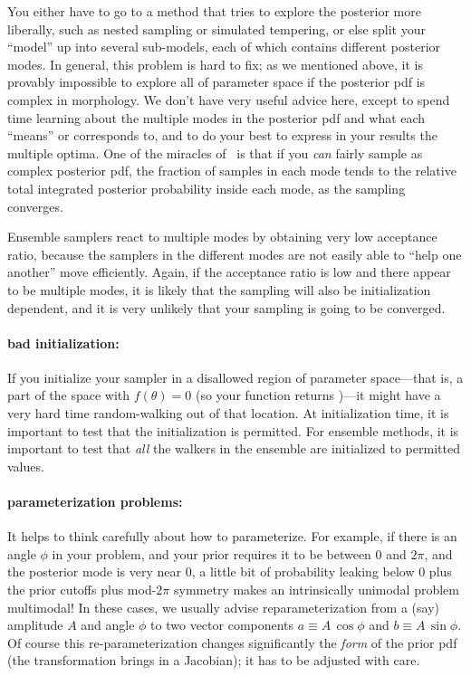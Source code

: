 \documentclass[12pt,twoside,pdftex]{article}
\newcommand{\MCMC}{\acronym{MCMC}}
\newcommand{\pars}{\theta}
\begin{document}
You either have to go to a method that tries to explore the posterior
  more liberally, such as nested sampling or simulated tempering,
  or else split your ``model'' up into several sub-models,
  each of which contains different posterior modes.
In general, this problem is hard to fix;
  as we mentioned above, it is provably impossible
  to explore all of parameter space if the posterior pdf is
  complex in morphology.
We don't have very useful advice here, except to
  spend time learning about the multiple modes in the posterior pdf
  and what each ``means'' or corresponds to,
  and to do your best to express in your results the multiple optima.
One of the miracles of \MCMC\ is that if you \emph{can} fairly sample
  as complex posterior pdf,
  the fraction of samples in each mode
  tends to the relative total integrated posterior probability inside each mode,
  as the sampling converges.

Ensemble samplers react to multiple modes
  by obtaining very low acceptance ratio,
  because the samplers in the different modes are not easily able to ``help one another''
  move efficiently.
Again, if the acceptance ratio is low and there appear to be multiple modes,
  it is likely that the sampling will also be initialization dependent,
  and it is very unlikely that your sampling is going to be converged.

\paragraph{bad initialization:}
If you initialize your sampler in a disallowed region of parameter
space---that is, a part of the space with $f(\pars)=0$ (so your
 function returns )---it might have a very
hard time random-walking out of that location.
At initialization time, it is important to test that the
initialization is permitted.
For ensemble methods, it is important to test that \emph{all} the
walkers in the ensemble are initialized to permitted values.

\paragraph{parameterization problems:}
It helps to think carefully about how to parameterize.
For example, if there is an angle $\phi$ in your problem,
  and your prior requires it to be between $0$ and $2\pi$,
  and the posterior mode is very near $0$,
  a little bit of probability leaking below $0$ plus the prior cutoffs plus mod-$2\pi$ symmetry
  makes an intrinsically unimodal problem multimodal!
In these cases, we usually advise reparameterization from a (say) amplitude $A$ and angle $\phi$
  to two vector components $a\equiv A\,\cos\phi$ and $b\equiv A\,\sin\phi$.
Of course this re-parameterization changes significantly the \emph{form} of the prior pdf
  (the transformation brings in a Jacobian);
  it has to be adjusted with care.
\end{document}
